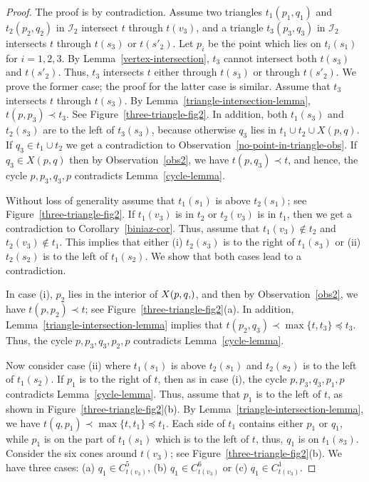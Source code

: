\documentclass[11pt,a4paper]{article}
\newcommand{\trmin}{t}
\newcommand{\hex}[2]{X(#1,#2)}
\newcommand{\tra}[2]{{#1}({#2})}
\begin{document}
\begin{proof}
The proof is by contradiction. Assume two triangles $t_1(p_1,q_1)$ and $t_2(p_2,q_2)$ in $\mathcal{I}_2$ intersect $\trmin$ through $\tra{\trmin}{v_3}$, and a triangle $t_3(p_3,q_3)$ in $\mathcal{I}_2$ intersects $\trmin$ through $\tra{\trmin}{s_3}$ or $\tra{\trmin}{s'_2}$. Let $p_i$ be the point which lies on $t_i(s_1)$ for $i=1,2,3$. By Lemma~\ref{vertex-intersection}, $t_3$ cannot intersect both $\tra{\trmin}{s_3}$ and $\tra{\trmin}{s'_2}$. Thus, $t_3$ intersects $t$ either through $\tra{\trmin}{s_3}$ or through $\tra{\trmin}{s'_2}$. We prove the former case; the proof for the latter case is similar. Assume that $t_3$ intersects $t$ through $\tra{\trmin}{s_3}$. By Lemma~\ref{triangle-intersection-lemma}, $t(p,p_3)\prec t_3$. See Figure~\ref{three-triangle-fig2}. In addition, both $t_1(s_3)$ and $t_2(s_3)$ are to the left of $t_3(s_3)$, because otherwise $q_3$ lies in $t_1\cup t_2\cup \hex{p}{q}$. If $q_3\in t_1\cup t_2$ we get a contradiction to Observation~\ref{no-point-in-triangle-obs}. If $q_3\in \hex{p}{q}$ then by Observation~\ref{obs2}, we have $t(p,q_3)\prec t$, and hence, the cycle $p,p_3,q_3,p$ contradicts Lemma~\ref{cycle-lemma}.

Without loss of generality assume that $\tra{t_1}{s_1}$ is above $\tra{t_2}{s_1}$; see Figure~\ref{three-triangle-fig2}. If $\tra{t_1}{v_3}$ is in $t_2$ or $\tra{t_2}{v_3}$ is in $t_1$, then we get a contradiction to Corollary~\ref{biniaz-cor}. Thus, assume that $\tra{t_1}{v_3}\notin t_2$ and $\tra{t_2}{v_3} \notin t_1$. This implies that either (i) $\tra{t_2}{s_3}$ is to the right of $\tra{t_1}{s_3}$ or (ii) $\tra{t_2}{s_2}$ is to the left of $\tra{t_1}{s_2}$. We show that both cases lead to a contradiction.

In case (i), $p_2$ lies in the interior of $\hex{p,q}$, and then by Observation~\ref{obs2}, we have $t(p,p_2)\prec t$; see Figure~\ref{three-triangle-fig2}(a). In addition, Lemma~\ref{triangle-intersection-lemma} implies that $t(p_2,q_3)\prec \max\{t,t_3\}\preceq t_3$. Thus, the cycle $p,p_3,q_3,p_2,p$ contradicts Lemma~\ref{cycle-lemma}.

Now consider case (ii) where $\tra{t_1}{s_1}$ is above $\tra{t_2}{s_1}$ and $\tra{t_2}{s_2}$ is to the left of $\tra{t_1}{s_2}$. If $p_1$ is to the right of $t$, then as in case (i), the cycle $p,p_3,q_3,p_1,p$ contradicts Lemma~\ref{cycle-lemma}. Thus, assume that $p_1$ is to the left of $t$, as shown in Figure~\ref{three-triangle-fig2}(b). By Lemma~\ref{triangle-intersection-lemma}, we have $t(q,p_1)\prec \max\{t,t_1\}\preceq t_1$. Each side of $t_1$ contains either $p_1$ or $q_1$, while $p_1$ is on the part of $t_1(s_1)$ which is to the left of $t$, thus, $q_1$ is on $\tra{t_1}{s_3}$. Consider the six cones around $\tra{t}{v_3}$; see Figure~\ref{three-triangle-fig2}(b). We have three cases: (a) $q_1\in C^5_{\tra{t}{v_3}}$, (b) $q_1\in C^6_{\tra{t}{v_3}}$ or (c) $q_1\in C^1_{\tra{t}{v_3}}$. 


\end{proof}
\end{document}
